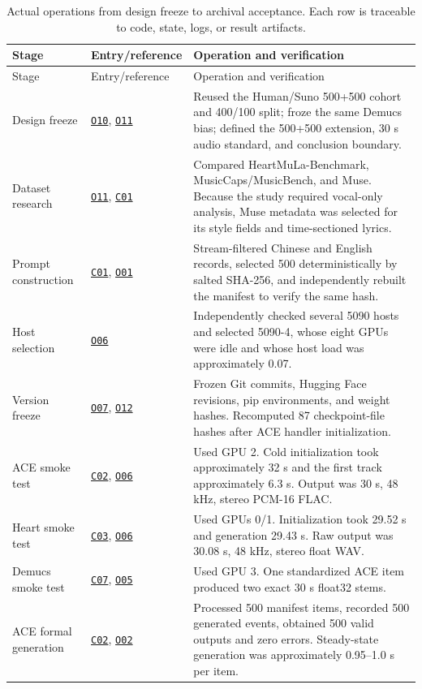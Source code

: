 \documentclass[11pt,a4paper]{article}
\newcommand{\coderef}[1]{\hyperlink{code:#1}{\texttt{#1}}}
\newcommand{\outref}[1]{\hyperlink{output:#1}{\texttt{#1}}}
\begin{document}
\begin{longtable}{p{22mm}p{36mm}p{86mm}}
\caption{Actual operations from design freeze to archival acceptance. Each row is traceable to code, state, logs, or result artifacts.}
\label{tab:timeline}\\
\toprule
Stage & Entry/reference & Operation and verification \\
\midrule
\endfirsthead
\toprule
Stage & Entry/reference & Operation and verification \\
\midrule
\endhead
Design freeze & \outref{O10}, \outref{O11} & Reused the Human/Suno 500+500 cohort and 400/100 split; froze the same Demucs bias; defined the 500+500 extension, 30 s audio standard, and conclusion boundary. \\
Dataset research & \outref{O11}, \coderef{C01} & Compared HeartMuLa-Benchmark, MusicCaps/MusicBench, and Muse. Because the study required vocal-only analysis, Muse metadata was selected for its style fields and time-sectioned lyrics. \\
Prompt construction & \coderef{C01}, \outref{O01} & Stream-filtered Chinese and English records, selected 500 deterministically by salted SHA-256, and independently rebuilt the manifest to verify the same hash. \\
Host selection & \outref{O06} & Independently checked several 5090 hosts and selected 5090-4, whose eight GPUs were idle and whose host load was approximately 0.07. \\
Version freeze & \outref{O07}, \outref{O12} & Frozen Git commits, Hugging Face revisions, pip environments, and weight hashes. Recomputed 87 checkpoint-file hashes after ACE handler initialization. \\
ACE smoke test & \coderef{C02}, \outref{O06} & Used GPU 2. Cold initialization took approximately 32 s and the first track approximately 6.3 s. Output was 30 s, 48 kHz, stereo PCM-16 FLAC. \\
Heart smoke test & \coderef{C03}, \outref{O06} & Used GPUs 0/1. Initialization took 29.52 s and generation 29.43 s. Raw output was 30.08 s, 48 kHz, stereo float WAV. \\
Demucs smoke test & \coderef{C07}, \outref{O05} & Used GPU 3. One standardized ACE item produced two exact 30 s float32 stems. \\
ACE formal generation & \coderef{C02}, \outref{O02} & Processed 500 manifest items, recorded 500 generated events, obtained 500 valid outputs and zero errors. Steady-state generation was approximately 0.95--1.0 s per item. \\

\end{longtable}
\end{document}
